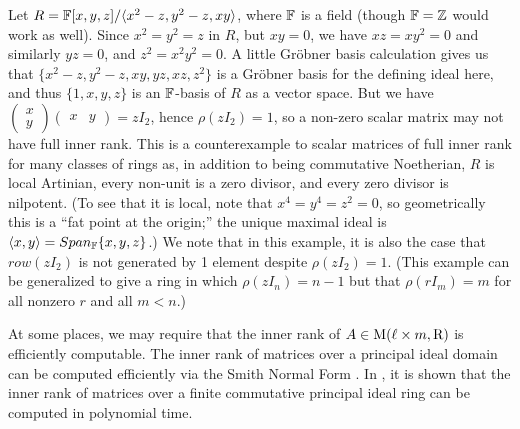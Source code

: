 \begin{example} \label{ex:nonreduced}
	Let $R = \mathbb{F}[x,y,z] / \langle x^2 - z, y^2 - z, xy \rangle$, where $\mathbb{F}$ is a field (though $\mathbb{F}=\mathbb{Z}$ would work as well). Since $x^2 = y^2 = z$ in $R$, but $xy=0$, we have $xz = xy^2 = 0$ and similarly $yz=0$, and $z^2 = x^2 y^2 = 0$. A little Gröbner basis calculation gives us that $\{x^2-z, y^2-z, xy, yz, xz, z^2\}$ is a Gröbner basis for the defining ideal here, and thus $\{1,x,y,z\}$ is an $\mathbb{F}$-basis of $R$ as a vector space. But we have $\begin{pmatrix} x \\ y \end{pmatrix} \begin{pmatrix} x & y \end{pmatrix} = z I_2$, hence $\rho(z I_2) = 1$, so a non-zero scalar matrix may not have full inner rank. This is a counterexample to scalar matrices of full inner rank for many classes of rings as, in addition to being commutative Noetherian, $R$ is local Artinian, every non-unit is a zero divisor, and every zero divisor is nilpotent. (To see that it is local, note that $x^4 = y^4 = z^2 = 0$, so geometrically this is a ``fat point at the origin;'' the unique maximal ideal is $\langle x,y \rangle = Span_{\mathbb{F}}\{x,y,z\}$.) We note that in this example, it is also the case that $row(z I_2)$ is not generated by 1 element despite $\rho(z I_2)=1$. (This example can be generalized to give a ring in which $\rho(z I_n) = n-1$ but that $\rho(r I_m) = m$ for all nonzero $r$ and all $m < n$.)
\end{example}

At some places, we may require that the inner rank of $A\in \mathrm{M}(\ell\times m, \mathrm{R})$ is efficiently computable. The inner rank of matrices over a principal ideal domain can be computed efficiently via the Smith Normal Form \cite{SmithNF,SmithNFJournal}. In \cite{inner-rank-comp}, it is shown that the inner rank of matrices over a finite commutative principal ideal ring can be computed in polynomial time.


